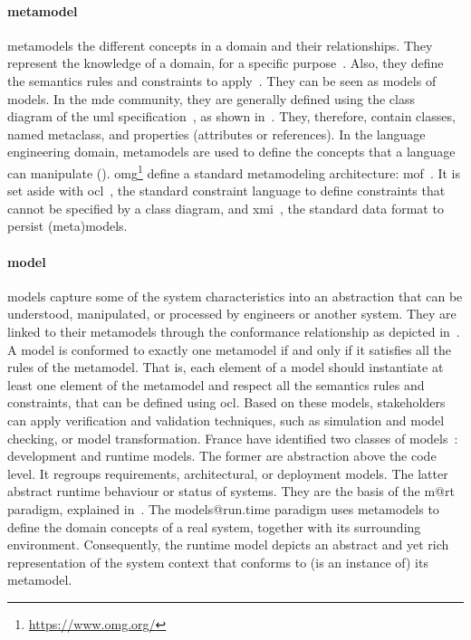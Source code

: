 \paragraph{\Gls{metamodel}}
\Glspl{metamodel} the different concepts in a domain and their relationships.
They represent the knowledge of a domain, for a specific purpose~\cite{DBLP:conf/iceccs/BezivinJT05}.
Also, they define the semantics rules and constraints to apply~\cite{DBLP:journals/computer/Schmidt06}.
They can be seen as \glspl{model} of \glspl{model}.
In the \gls{mde} community, they are generally defined using the class diagram of the \gls{uml} specification~\cite{omg2017umlspec}, as shown in~.
They, therefore, contain classes, named metaclass, and properties (attributes or references).
In the language engineering domain, \glspl{metamodel} are used to define the concepts that a language can manipulate (\cf {}).
\gls{omg}\footnote{\url{https://www.omg.org/}} define a standard metamodeling architecture: \gls{mof}~\cite{MOF:Spec}.
It is set aside with \gls{ocl}~\cite{OCL:Spec}, the standard constraint language to define constraints that cannot be specified by a class diagram, and \gls{xmi}~\cite{XMI:Spec}, the standard data format to persist (meta)\glspl{model}. 

\paragraph{\Gls{model}}
\Glspl{model} capture some of the system characteristics into an abstraction that can be understood, manipulated, or processed by engineers or another system.
They are linked to their \glspl{metamodel} through the conformance relationship as depicted in~.
A \gls{model} is conformed to exactly one \gls{metamodel} if and only if it satisfies all the rules of the \gls{metamodel}.
That is, each element of a \gls{model} should instantiate at least one element of the \gls{metamodel} and respect all the semantics rules and constraints, that can be defined using \gls{ocl}.
Based on these models, stakeholders can apply verification and validation techniques, such as simulation and model checking, or model transformation.
France \etal have identified two classes of models~\cite{DBLP:conf/icse/FranceR07}: development and runtime models.
The former are abstraction above the code level.
It regroups requirements, architectural, or deployment models.
The latter abstract runtime behaviour or status of systems. 
They are the basis of the \gls{m@rt} paradigm, explained in~.
The models@run.time paradigm uses \glspl{metamodel} to define the domain concepts of a real system, together with its surrounding environment. 
Consequently, the runtime model depicts an abstract and yet rich representation of the system context that conforms to (is an instance of) its \gls{metamodel}.

